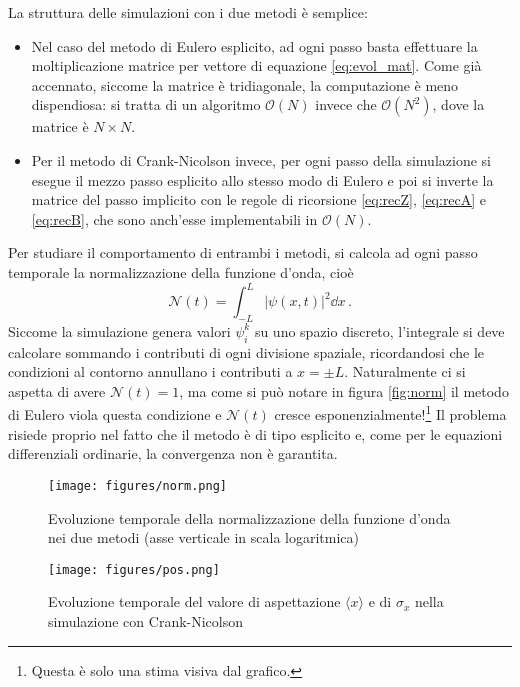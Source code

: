 \documentclass[a4paper, titlepage]{article}
\numberwithin{equation}{section}
\begin{document}
La struttura delle simulazioni con i due metodi è semplice:
\begin{itemize}
    \item Nel caso del metodo di Eulero esplicito, ad ogni passo basta effettuare la moltiplicazione matrice per vettore di equazione \eqref{eq:evol_mat}. Come già accennato, siccome la matrice è tridiagonale, la computazione è meno dispendiosa: si tratta di un algoritmo $\mathcal{O}(N)$ invece che $\mathcal{O}(N^2)$, dove la matrice è $N\times N$.
    \item Per il metodo di Crank-Nicolson invece, per ogni passo della simulazione si esegue il mezzo passo esplicito allo stesso modo di Eulero e poi si inverte la matrice del passo implicito con le regole di ricorsione \eqref{eq:recZ}, \eqref{eq:recA} e \eqref{eq:recB}, che sono anch'esse implementabili in $\mathcal{O}(N)$.
\end{itemize}

Per studiare il comportamento di entrambi i metodi, si calcola ad ogni passo temporale la normalizzazione della funzione d'onda, cioè
\[
    \mathcal{N}(t) = \int_{-L}^L |\psi(x,t)|^2 \dd{x}\, .
\]
Siccome la simulazione genera valori $\psi_i^k$ su uno spazio discreto, l'integrale si deve calcolare sommando i contributi di ogni divisione spaziale, ricordandosi che le condizioni al contorno annullano i contributi a $x = \pm L$.
Naturalmente ci si aspetta di avere $\mathcal{N}(t) = 1$, ma come si può notare in figura \ref{fig:norm} il metodo di Eulero viola questa condizione e $\mathcal{N}(t)$ cresce esponenzialmente!\footnote{Questa è solo una stima visiva dal grafico.}
Il problema risiede proprio nel fatto che il metodo è di tipo esplicito e, come per le equazioni differenziali ordinarie, la convergenza non è garantita. 

\begin{figure}[h!]
    \centering
    \begin{minipage}{0.47 \textwidth}
        \centering
        \texttt{[image: figures/norm.png]}
        \caption{Evoluzione temporale della normalizzazione della funzione d'onda nei due metodi (asse verticale in scala logaritmica)}
        \label{fig:norm}
    \end{minipage}
    \hspace{0.02\textwidth}
    \begin{minipage}{0.47 \textwidth}
        \centering
        \texttt{[image: figures/pos.png]}
        \caption{Evoluzione temporale del valore di aspettazione $\langle x \rangle$ e di $\sigma_x$ nella simulazione con Crank-Nicolson}
        \label{fig:pos}
    \end{minipage}
\end{figure}
\end{document}
